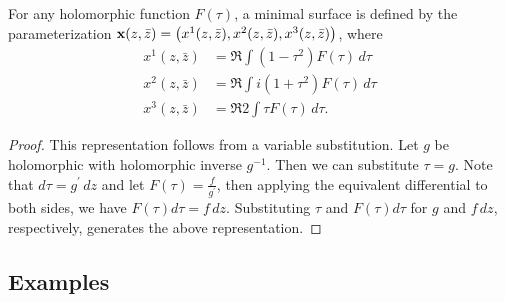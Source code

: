   \begin{thm}
    For any holomorphic function $F(\tau)$, a minimal surface is defined by the parameterization $\mathbf{x}(z, \bar{z}) = \left(x^1(z, \bar{z}), x^2(z, \bar{z}), x^3(z, \bar{z})\right)$, where
    \begin{align*}
      x^1(z, \bar{z}) &= \Re\int\!\left(1 - \tau^2\right)F(\tau)\,d\tau\\
      x^2(z, \bar{z}) &= \Re\int\!i \left(1 + \tau^2\right)F(\tau)\,d\tau\\
      x^3(z, \bar{z}) &= \Re2\int\!\tau F(\tau)\,d\tau.
    \end{align*}
  \end{thm}
  \begin{proof}
    This representation follows from a variable substitution. Let $g$ be holomorphic with holomorphic inverse $g^{-1}$. Then we can substitute $\tau = g$. Note that $d\tau = g^\prime\,dz$ and let $F(\tau) = \frac{f}{g^\prime}$, then applying the equivalent differential to both sides, we have $F(\tau)d\tau = f\,dz$. Substituting $\tau$ and $F(\tau)d\tau$ for $g$ and $f\,dz$, respectively, generates the above representation.
  \end{proof}

\subsection{Examples}

